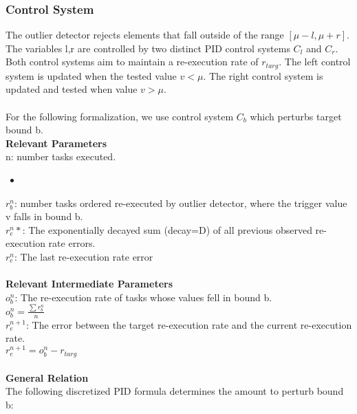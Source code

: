 \documentclass[11pt]{article}
\begin{document}
\subsubsection {Control System}
The outlier detector rejects elements that fall outside of the range $[\mu - l, \mu + r]$. The variables l,r are controlled by two distinct PID control systems $C_l$ and $C_r$. Both control systems aim to maintain a re-execution rate of $r_{targ}$. The left control system is updated when the tested value $v<\mu$. The right control system is updated and tested when value $v>\mu$.\\\\
For the following formalization, we use control system $C_b$ which perturbs target bound b.\\
\textbf{Relevant Parameters}\\
n: number tasks executed.\\
\begin{itemize}
	\item 
\end{itemize}
$r_b^n$: number tasks ordered re-executed by outlier detector, where the trigger value v falls in bound b.\\
$r_e^{n}*$: The exponentially decayed sum (decay=D) of all previous observed re-execution rate errors.\\
$r_e^{n}$: The last re-execution rate error\\\\
\textbf {Relevant Intermediate Parameters}\\
$o_{b}^n$: The re-execution rate of tasks whose values fell in bound b.\\
$o_{b}^n = \frac {\sum r_b^n} {n}$\\
$r_{e}^{n+1}$: The error between the target re-execution rate and the current re-execution rate. \\
$r_e^{n+1} = o_{b}^n -r_{targ}$\\\\
\textbf{General Relation}\\
The following discretized PID formula determines the amount to perturb bound b:\\
\end{document}
